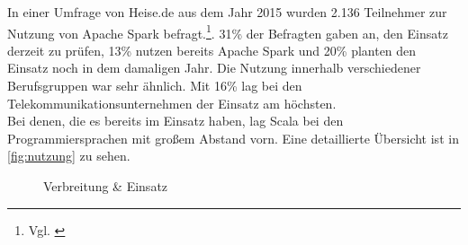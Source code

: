 \noindent
In einer Umfrage von Heise.de aus dem Jahr 2015 wurden 2.136 Teilnehmer zur Nutzung von Apache Spark befragt.\footnote{Vgl. \cite{HEISEBIGDATA}}. 31\% der Befragten gaben an, den Einsatz derzeit zu prüfen, 13\% nutzen bereits Apache Spark und 20\% planten den Einsatz noch in dem damaligen Jahr. Die Nutzung innerhalb verschiedener Berufsgruppen war sehr ähnlich. Mit 16\%  lag bei den Telekommunikationsunternehmen der Einsatz am höchsten.\\
Bei denen, die es bereits im Einsatz haben, lag Scala bei den Programmiersprachen mit großem Abstand vorn. Eine detaillierte Übersicht ist in \autoref{fig:nutzung} zu sehen.
\begin{figure}[h]
  \centering
  \caption{Verbreitung \& Einsatz}\label{fig:nutzung}
\end{figure}
